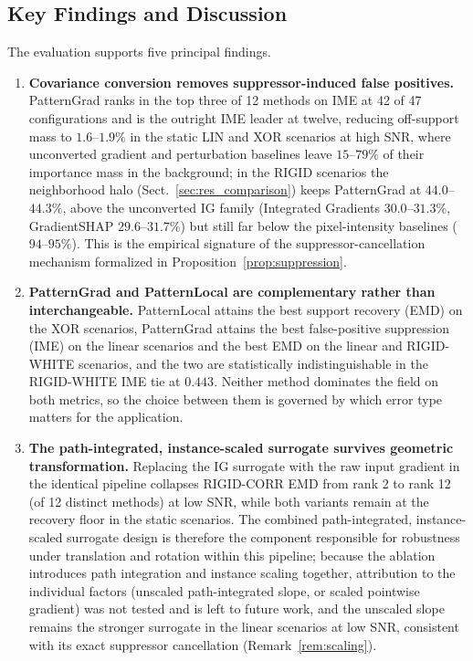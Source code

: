 \documentclass[pdflatex,sn-mathphys-num]{sn-jnl}
\theoremstyle{thmstyleone}
\theoremstyle{thmstyletwo}%
\theoremstyle{thmstylethree}%
\begin{document}
\subsection{Key Findings and Discussion}\label{sec:res_findings}

The evaluation supports five principal findings.

\begin{enumerate}
    \item \textbf{Covariance conversion removes suppressor-induced false positives.} PatternGrad ranks in the top three of 12 methods on IME at 42 of 47 configurations and is the outright IME leader at twelve, reducing off-support mass to $1.6$--$1.9\%$ in the static LIN and XOR scenarios at high SNR, where unconverted gradient and perturbation baselines leave $15$--$79\%$ of their importance mass in the background; in the RIGID scenarios the neighborhood halo (Sect.~\ref{sec:res_comparison}) keeps PatternGrad at $44.0$--$44.3\%$, above the unconverted IG family (Integrated Gradients $30.0$--$31.3\%$, GradientSHAP $29.6$--$31.7\%$) but still far below the pixel-intensity baselines ($94$--$95\%$). This is the empirical signature of the suppressor-cancellation mechanism formalized in Proposition~\ref{prop:suppression}.
    \item \textbf{PatternGrad and PatternLocal are complementary rather than interchangeable.} PatternLocal attains the best support recovery (EMD) on the XOR scenarios, PatternGrad attains the best false-positive suppression (IME) on the linear scenarios and the best EMD on the linear and RIGID-WHITE scenarios, and the two are statistically indistinguishable in the RIGID-WHITE IME tie at $0.443$. Neither method dominates the field on both metrics, so the choice between them is governed by which error type matters for the application.
    \item \textbf{The path-integrated, instance-scaled surrogate survives geometric transformation.} Replacing the IG surrogate with the raw input gradient in the identical pipeline collapses RIGID-CORR EMD from rank 2 to rank 12 (of 12 distinct methods) at low SNR, while both variants remain at the recovery floor in the static scenarios. The combined path-integrated, instance-scaled surrogate design is therefore the component responsible for robustness under translation and rotation within this pipeline; because the ablation introduces path integration and instance scaling together, attribution to the individual factors (unscaled path-integrated slope, or scaled pointwise gradient) was not tested and is left to future work, and the unscaled slope remains the stronger surrogate in the linear scenarios at low SNR, consistent with its exact suppressor cancellation (Remark~\ref{rem:scaling}).

\end{enumerate}
\end{document}
